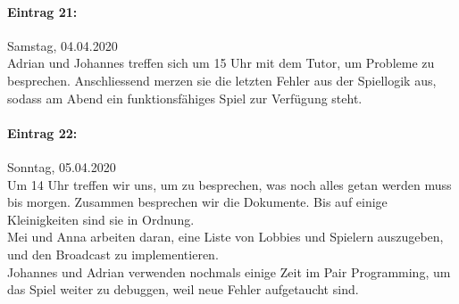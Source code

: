 \documentclass[12pt]{article}
\begin{document}
\paragraph{Eintrag 21:}
Samstag, 04.04.2020\\
Adrian und Johannes treffen sich um 15 Uhr mit dem Tutor, um Probleme zu besprechen. Anschliessend merzen sie die letzten Fehler aus der Spiellogik aus, sodass am Abend ein funktionsf\"ahiges Spiel zur Verf\"ugung steht.

\paragraph{Eintrag 22:}
Sonntag, 05.04.2020\\
Um 14 Uhr treffen wir uns, um zu besprechen, was noch alles getan werden muss bis morgen. Zusammen besprechen wir die Dokumente. Bis auf einige Kleinigkeiten sind sie in Ordnung.\\
Mei und Anna arbeiten daran, eine Liste von Lobbies und Spielern auszugeben, und den Broadcast zu implementieren.\\
Johannes und Adrian verwenden nochmals einige Zeit im Pair Programming, um das Spiel weiter zu debuggen, weil neue Fehler aufgetaucht sind.
\end{document}
